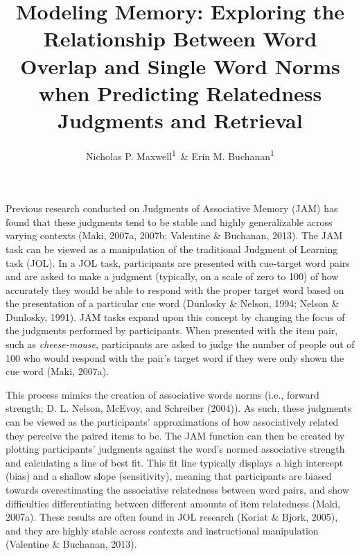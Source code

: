 \documentclass[english,man]{apa6}
\title{Modeling Memory: Exploring the Relationship Between Word Overlap and
Single Word Norms when Predicting Relatedness Judgments and Retrieval}
\author{Nicholas P. Maxwell\textsuperscript{1}~\& Erin M. Buchanan\textsuperscript{1}}
\affiliation{
    \vspace{0.5cm}
          \textsuperscript{1} Missouri State University  }
\theoremstyle{definition}
\theoremstyle{definition}
\theoremstyle{definition}
\theoremstyle{remark}
\begin{document}
\maketitle

\setcounter{secnumdepth}{0}



Previous research conducted on Judgments of Associative Memory (JAM) has
found that these judgments tend to be stable and highly generalizable
across varying contexts (Maki, 2007a, 2007b; Valentine \& Buchanan,
2013). The JAM task can be viewed as a manipulation of the traditional
Judgment of Learning task (JOL). In a JOL task, participants are
presented with cue-target word pairs and are asked to make a judgment
(typically, on a scale of zero to 100) of how accurately they would be
able to respond with the proper target word based on the presentation of
a particular cue word (Dunlosky \& Nelson, 1994; Nelson \& Dunlosky,
1991). JAM tasks expand upon this concept by changing the focus of the
judgments performed by participants. When presented with the item pair,
such as \emph{cheese-mouse}, participants are asked to judge the number
of people out of 100 who would respond with the pair's target word if
they were only shown the cue word (Maki, 2007a).

This process mimics the creation of associative words norms (i.e.,
forward strength; D. L. Nelson, McEvoy, and Schreiber (2004)). As such,
these judgments can be viewed as the participants' approximations of how
associatively related they perceive the paired items to be. The JAM
function can then be created by plotting participants' judgments against
the word's normed associative strength and calculating a line of best
fit. This fit line typically displays a high intercept (bias) and a
shallow slope (sensitivity), meaning that participants are biased
towards overestimating the associative relatedness between word pairs,
and show difficulties differentiating between different amounts of item
relatedness (Maki, 2007a). These results are often found in JOL research
(Koriat \& Bjork, 2005), and they are highly stable across contexts and
instructional manipulation (Valentine \& Buchanan, 2013).
\end{document}
